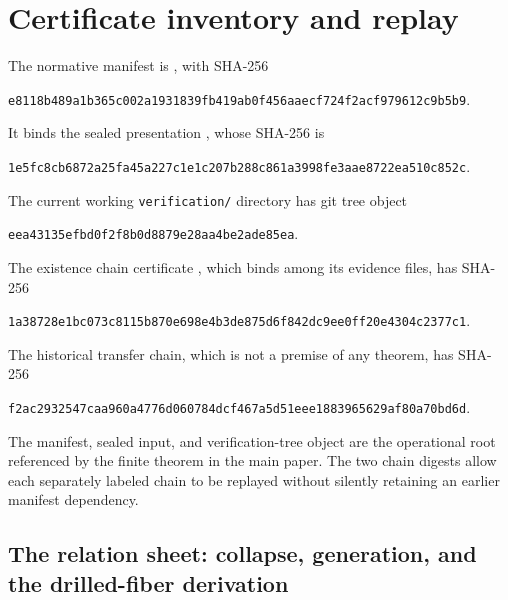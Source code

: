 \documentclass[11pt]{article}
\theoremstyle{definition}
\begin{document}
\section{Certificate inventory and replay}\label{sec:certificates}

The normative manifest is
, with
SHA-256
\begin{center}\small
\texttt{e8118b489a1b365c002a1931839fb419ab0f456aaecf724f2acf979612c9b5b9}.
\end{center}
It binds the sealed presentation
{\small{}},
whose SHA-256 is
\begin{center}\small
\texttt{1e5fc8cb6872a25fa45a227c1e1c207b288c861a3998fe3aae8722ea510c852c}.
\end{center}
The current working \texttt{verification/} directory has git tree object
\begin{center}\small
\texttt{eea43135efbd0f2f8b0d8879e28aa4be2ade85ea}.
\end{center}
The existence chain certificate
, which
binds  among its evidence files, has SHA-256
\begin{center}\small
\texttt{1a38728e1bc073c8115b870e698e4b3de875d6f842dc9ee0ff20e4304c2377c1}.
\end{center}
The historical transfer chain, which is not a premise of any theorem, has
SHA-256
\begin{center}\small
\texttt{f2ac2932547caa960a4776d060784dcf467a5d51eee1883965629af80a70bd6d}.
\end{center}
The manifest, sealed input, and verification-tree object are the operational
root referenced by the finite theorem in the main paper.  The two chain
digests allow each separately labeled chain to be replayed without silently
retaining an earlier manifest dependency.

\subsection{The relation sheet: collapse, generation, and the drilled-fiber derivation}
\end{document}
